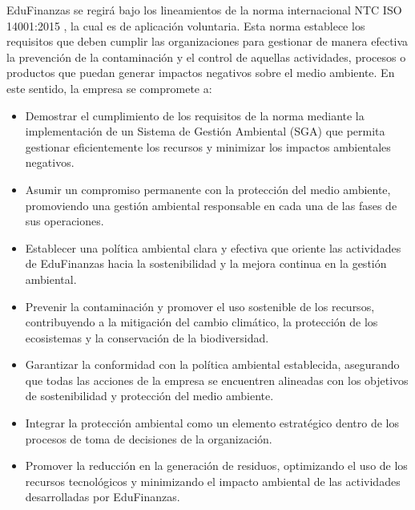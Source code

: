 EduFinanzas se regirá bajo los lineamientos de la norma internacional NTC ISO 14001:2015 \parencite{ISO14001}, la cual es de aplicación voluntaria. Esta norma establece los requisitos que deben cumplir las organizaciones para gestionar de manera efectiva la prevención de la contaminación y el control de aquellas actividades, procesos o productos que puedan generar impactos negativos sobre el medio ambiente. En este sentido, la empresa se compromete a:

\begin{itemize}
	\item Demostrar el cumplimiento de los requisitos de la norma mediante la implementación de un Sistema de Gestión Ambiental (SGA) que permita gestionar eficientemente los recursos y minimizar los impactos ambientales negativos.
	
	\item Asumir un compromiso permanente con la protección del medio ambiente, promoviendo una gestión ambiental responsable en cada una de las fases de sus operaciones.
	
	\item Establecer una política ambiental clara y efectiva que oriente las actividades de EduFinanzas hacia la sostenibilidad y la mejora continua en la gestión ambiental.
	
	\item Prevenir la contaminación y promover el uso sostenible de los recursos, contribuyendo a la mitigación del cambio climático, la protección de los ecosistemas y la conservación de la biodiversidad.
	
	\item Garantizar la conformidad con la política ambiental establecida, asegurando que todas las acciones de la empresa se encuentren alineadas con los objetivos de sostenibilidad y protección del medio ambiente.
	
	\item Integrar la protección ambiental como un elemento estratégico dentro de los procesos de toma de decisiones de la organización.
	
	\item Promover la reducción en la generación de residuos, optimizando el uso de los recursos tecnológicos y minimizando el impacto ambiental de las actividades desarrolladas por EduFinanzas.
\end{itemize}

